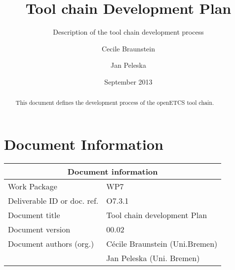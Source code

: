 \documentclass{openetcs_article}
\begin{document}
\frontmatter
{}




\title{Tool chain Development Plan}

\subtitle{Description of the tool chain development process}

\date{September 2013}


\author{Cecile Braunstein \and Jan Peleska}







\begin{abstract}
  This document defines the development process of the openETCS tool
  chain. 

\end{abstract}

\maketitle
\tableofcontents
\listoffiguresandtables

\newpage

\section*{Document Information}
\begin{tabular}{|p{4.4cm}|p{8.7cm}|}
\hline
\multicolumn{2}{|c|}{Document information} \\
\hline
Work Package &  WP7  \\
Deliverable ID or doc. ref. & O7.3.1\\
\hline
Document title & Tool chain development Plan \\
Document version & 00.02 \\
Document authors (org.)  & Cécile Braunstein  (Uni.Bremen)  \\
& Jan Peleska (Uni. Bremen)\\
\hline
\end{tabular}
\end{document}
